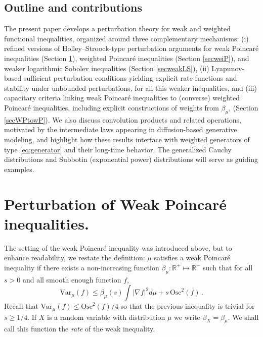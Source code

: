 \documentclass[11pt,reqno]{amsart}
\numberwithin{equation}{section}
\theoremstyle{definition}
\theoremstyle{remark}
\def \Var {\textrm{Var}}
\def \Osc {\textrm{Osc}}
\begin{document}
\subsection{Outline and contributions}

The present paper develops a perturbation theory for weak and weighted functional inequalities, organized around three complementary mechanisms:
(i) refined versions of Holley--Stroock-type perturbation arguments for weak Poincar\'e inequalities (Section \ref{secweakP}), weighted Poincar\'e inequalities (Section \ref{secweiP}), and weaker logarithmic Sobolev inequalities (Section \ref{secweakLS}),
(ii) Lyapunov-based sufficient perturbation conditions yielding explicit rate functions and stability under unbounded perturbations, for all this weaker inequalities,
and (iii) capacitary criteria linking weak Poincar\'e inequalities to (converse) weighted Poincar\'e inequalities, including explicit constructions of weights from $\beta_\mu$, (Section \ref{secWPtowP}).
We also discuss convolution products and related operations, motivated by the intermediate laws appearing in diffusion-based generative modeling, and highlight how these results interface with weighted generators of type \eqref{eq:generator} and their long-time behavior. The generalized Cauchy distributions and Subbotin (exponential power) distributions will serve as guiding examples.




\section{Perturbation of Weak Poincar\'e inequalities.}\label{secweakP}

The setting of the weak Poincar\'e inequality was introduced above, but to enhance readability, we restate the definition: $\mu$ satisfies a weak Poincar\'e inequality if there exists a non-increasing function $\beta_\mu: \mathbb R^+ \mapsto \mathbb R^+$ such that for all $s>0$ and all smooth enough function $f$, 
\begin{equation}\label{eqWPdef}
\Var_\mu(f) \leq \beta_\mu(s) \int |\nabla f|^2 d\mu + s \, \Osc^2(f) \, .
\end{equation}
 Recall that $\Var_\mu(f) \leq \Osc^2(f)/4$ so that the previous inequality is trivial for $s\geq 1/4$. If $X$ is a random variable with distribution $\mu$ we write $\beta_X=\beta_\mu$. We shall call this function the \emph{rate} of the weak inequality.
\end{document}
